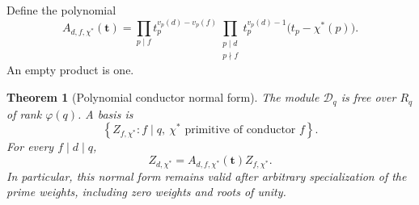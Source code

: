 \documentclass[11pt]{article}
\numberwithin{equation}{section}
\newtheorem{theorem}{Theorem}[section]
\theoremstyle{definition}\newtheorem{definition}[theorem]{Definition}
\theoremstyle{remark}\newtheorem{remark}[theorem]{Remark}
\newcommand{\ch}{\chi^*}
\begin{document}
Define the polynomial
\begin{equation}\label{eq:Apoly}
A_{d,f,\ch}(\mathbf t)=
\prod_{p\mid f}t_p^{v_p(d)-v_p(f)}
\prod_{\substack{p\mid d\\p\nmid f}}
 t_p^{v_p(d)-1}\bigl(t_p-\ch(p)\bigr).
\end{equation}
An empty product is one.

\begin{theorem}[Polynomial conductor normal form]\label{thm:free}
The module $\mathscr D_q$ is free over $R_q$ of rank $\varphi(q)$.
A basis is
\begin{equation}\label{eq:basis}
\left\{Z_{f,\ch}: f\mid q,\ \ch\text{ primitive of conductor }f\right\}.
\end{equation}
For every $f\mid d\mid q$,
\begin{equation}\label{eq:normal}
Z_{d,\ch}=A_{d,f,\ch}(\mathbf t)Z_{f,\ch}.
\end{equation}
In particular, this normal form remains valid after arbitrary specialization
of the prime weights, including zero weights and roots of unity.
\end{theorem}
\end{document}
